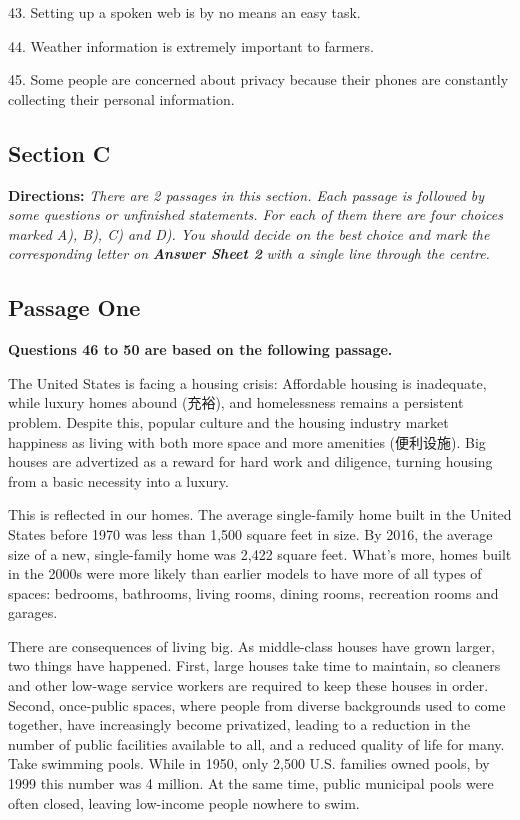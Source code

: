 \documentclass[UTF8,11pt]{ctexart}
\begin{document}
43. Setting up a spoken web is by no means an easy task.


44. Weather information is extremely important to farmers.


45. Some people are concerned about privacy because their phones are constantly collecting their personal information.


\subsection*{\textbf{Section C}}


\textbf{Directions: }\textit{There are 2 passages in this section. Each passage is followed by some questions or unfinished} \textit{statements. For each of them there are four choices marked A), B), C) and D). You should decide on the best} \textit{choice and mark the corresponding letter on }\textbf{\textit{Answer Sheet 2}}\textit{ with a single line through the centre.}


\subsection*{\textbf{Passage One}}


\textbf{Questions 46 to 50 are based on the following passage.}


The United States is facing a housing crisis: Affordable housing is inadequate, while luxury homes abound (充裕), and homelessness remains a persistent problem. Despite this, popular culture and the housing industry market happiness as living with both more space and more amenities (便利设施). Big houses are advertized as a reward for hard work and diligence, turning housing from a basic necessity into a luxury.


This is reflected in our homes. The average single-family home built in the United States before 1970 was less than 1,500 square feet in size. By 2016, the average size of a new, single-family home was 2,422 square feet. What’s more, homes built in the 2000s were more likely than earlier models to have more of all types of spaces: bedrooms, bathrooms, living rooms, dining rooms, recreation rooms and garages.


There are consequences of living big. As middle-class houses have grown larger, two things have happened. First, large houses take time to maintain, so cleaners and other low-wage service workers are required to keep these houses in order. Second, once-public spaces, where people from diverse backgrounds used to come together, have increasingly become privatized, leading to a reduction in the number of public facilities available to all, and a reduced quality of life for many. Take swimming pools. While in 1950, only 2,500 U.S. families owned pools, by 1999 this number was 4 million. At the same time, public municipal pools were often closed, leaving low-income people nowhere to swim.
\end{document}
